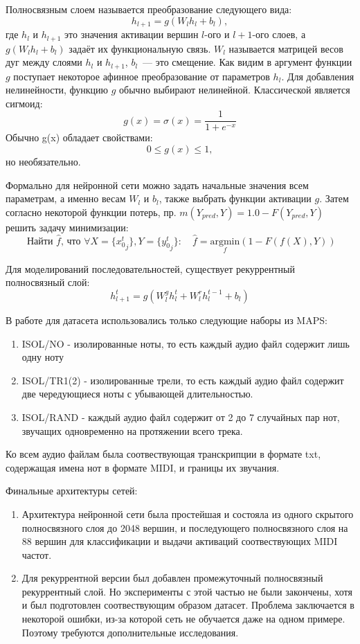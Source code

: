 Полносвязным слоем называется преобразование следующего вида:
\[
  h_{l + 1} = g(W_l h_l + b_l),
\]
где $h_l$ и $h_{l + 1}$ это значения активации вершин $l$-ого и  $l+1$-ого слоев,
а $g(W_l h_l + b_l)$ задаёт их функциональную связь.
$W_l$ называется матрицей весов дуг
между слоями $h_l$ и $h_{l + 1}$, $b_l$~--- это смещение. Как видим
в аргумент функции $g$ поступает некоторое афинное преобразование
от параметров $h_l$.
Для добавления нелинейности, функцию $g$ обычно выбирают нелинейной.
Классической является сигмоид:
\[
  g(x) = \sigma (x) = \frac{1}{1 + e^{-x}}
\]
Обычно g(x) обладает свойствами:
\[
  0 \leq  g(x) \leq 1,
\]
но необязательно.

Формально для нейронной сети можно задать начальные значения всем параметрам,
а именно весам $W_l$ и $b_l$, также выбрать функции активации $g$.
Затем согласно некоторой функции потерь,
пр. $m(Y_{pred}, Y) = 1.0 - F(Y_{pred}, Y)$
решить задачу минимизации:
\[
  \text{ Найти $\hat f$, что } \forall X=\{{x_0^t}_j\}, Y=\{{y_0^t}_j\}: \quad
  \hat f = \underset{f}{\text{argmin}}(1 - F(f(X), Y))
\]

Для моделирований последовательностей, существует рекуррентный полносвязный
слой:
\[
  h_{l + 1}^t = g(W_l^g h_l^t + W_l^r h_l^{t - 1} + b_l)
\]

В работе для датасета использовались только следующие наборы из MAPS:
\begin{enumerate}
  \item ISOL/NO - изолированные ноты, то есть каждый аудио файл содержит лишь
    одну ноту
  \item ISOL/TR1(2) - изолированные трели, то есть каждый аудио файл содержит
    две чередующиеся ноты с убывающей длительностью.
  \item ISOL/RAND - каждый аудио файл содержит от 2 до 7 случайных пар нот,
    звучащих одновременно на протяжении всего трека.
\end{enumerate}

Ко всем аудио файлам была соотвествующая транскрипции в формате txt,
содержащая имена нот в формате MIDI, и границы их звучания.

Финальные архитектуры сетей:
\begin{enumerate}
  \item Архитектура нейронной сети была простейшая и состояла
    из одного скрытого полносвязного слоя до 2048 вершин,
    и последующего полносвязного слоя на 88 вершин для классификации
    и выдачи активаций соотвествующих MIDI частот.

  \item Для рекуррентной версии был добавлен промежуточный
    полносвязный рекуррентный слой. Но эксперименты с этой частью не были
    закончены, хотя и был подготовлен соотвествующим образом датасет. Проблема
    заключается в некоторой ошибки, из-за которой сеть не обучается даже
    на одном примере. Поэтому требуются дополнительные исследования.
\end{enumerate}

